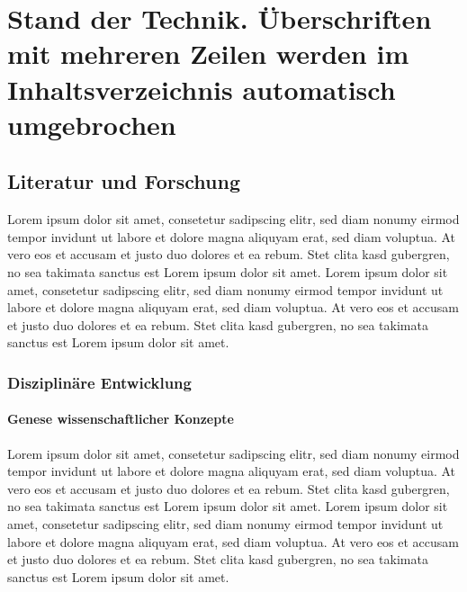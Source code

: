 
\chapter[Stand der Technik]{Stand der Technik. Überschriften mit mehreren Zeilen werden im Inhaltsverzeichnis automatisch umgebrochen}
\label{cha:Stand der Technik}

\section{Literatur und Forschung}
\label{sec:Literatur und Forschung}
Lorem ipsum \citet{Bucher2021, Zeitschriftler2000} dolor sit amet, consetetur sadipscing elitr, sed diam nonumy eirmod tempor invidunt ut labore et dolore magna aliquyam erat, sed diam voluptua. At vero eos et accusam et justo duo dolores et ea rebum. Stet clita kasd gubergren, no sea takimata sanctus est Lorem ipsum dolor sit amet. Lorem ipsum dolor sit amet, consetetur sadipscing elitr, sed diam nonumy eirmod tempor invidunt ut labore et dolore magna aliquyam erat, sed diam voluptua. At vero eos et accusam et justo duo dolores et ea rebum. \glqq Stet clita kasd gubergren, no sea takimata sanctus est Lorem ipsum dolor sit amet.\grqq~

\subsection{Disziplinäre Entwicklung}
\label{ssec:Disziplinäre Entwicklung}

\vspace{3mm}
\subsubsection{Genese wissenschaftlicher Konzepte}
\label{sssec:Genese wissenschaftlicher Konzepte}
Lorem ipsum dolor sit amet, consetetur sadipscing elitr, sed diam nonumy eirmod tempor invidunt ut labore et dolore magna aliquyam erat, sed diam voluptua. At vero eos et accusam et justo duo dolores et ea rebum. Stet clita kasd gubergren, no sea takimata sanctus est Lorem ipsum dolor sit amet. Lorem ipsum dolor sit amet, consetetur sadipscing elitr, sed diam nonumy eirmod tempor invidunt ut labore et dolore magna aliquyam erat, sed diam voluptua. At vero eos et accusam et justo duo dolores et ea rebum. Stet clita kasd gubergren, no sea takimata sanctus est Lorem ipsum dolor sit amet.

